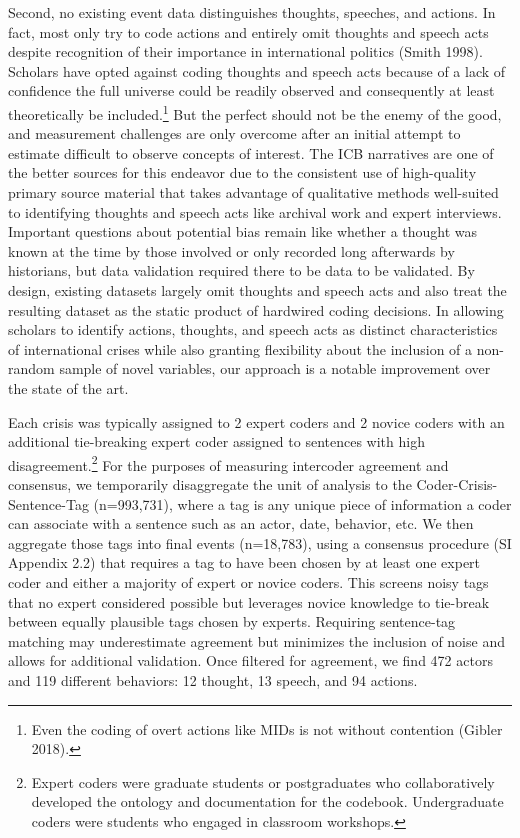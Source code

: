 \documentclass{article}
\begin{document}
Second, no existing event data distinguishes thoughts, speeches, and
actions. In fact, most only try to code actions and entirely omit
thoughts and speech acts despite recognition of their importance in
international politics (Smith 1998). Scholars have opted against coding
thoughts and speech acts because of a lack of confidence the full
universe could be readily observed and consequently at least
theoretically be included.\footnote{Even the coding of overt actions
  like MIDs is not without contention (Gibler 2018).} But the perfect
should not be the enemy of the good, and measurement challenges are only
overcome after an initial attempt to estimate difficult to observe
concepts of interest. The ICB narratives are one of the better sources
for this endeavor due to the consistent use of high-quality primary
source material that takes advantage of qualitative methods well-suited
to identifying thoughts and speech acts like archival work and expert
interviews. Important questions about potential bias remain like whether
a thought was known at the time by those involved or only recorded long
afterwards by historians, but data validation required there to be data
to be validated. By design, existing datasets largely omit thoughts and
speech acts and also treat the resulting dataset as the static product
of hardwired coding decisions. In allowing scholars to identify actions,
thoughts, and speech acts as distinct characteristics of international
crises while also granting flexibility about the inclusion of a
non-random sample of novel variables, our approach is a notable
improvement over the state of the art.

Each crisis was typically assigned to 2 expert coders and 2 novice
coders with an additional tie-breaking expert coder assigned to
sentences with high disagreement.\footnote{Expert coders were graduate
  students or postgraduates who collaboratively developed the ontology
  and documentation for the codebook. Undergraduate coders were students
  who engaged in classroom workshops.} For the purposes of measuring
intercoder agreement and consensus, we temporarily disaggregate the unit
of analysis to the Coder-Crisis-Sentence-Tag (n=993,731), where a tag is
any unique piece of information a coder can associate with a sentence
such as an actor, date, behavior, etc. We then aggregate those tags into
final events (n=18,783), using a consensus procedure (SI Appendix 2.2)
that requires a tag to have been chosen by at least one expert coder and
either a majority of expert or novice coders. This screens noisy tags
that no expert considered possible but leverages novice knowledge to
tie-break between equally plausible tags chosen by experts. Requiring
sentence-tag matching may underestimate agreement but minimizes the
inclusion of noise and allows for additional validation. Once filtered
for agreement, we find 472 actors and 119 different behaviors: 12
thought, 13 speech, and 94 actions.
\end{document}
